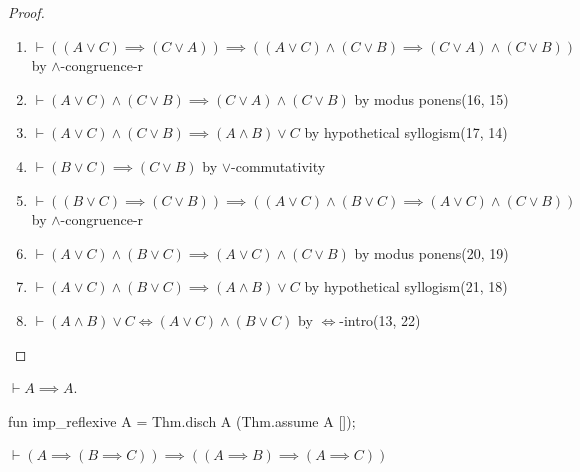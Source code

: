 \begin{proof}
\begin{enumerate}
\item $\vdash((A\lor C)\implies(C\lor A))\implies((A\lor C)\land(C\lor B)\implies(C\lor A)\land(C\lor B))$
  by $\land$-congruence-r%
\item $\vdash(A\lor C)\land(C\lor B)\implies(C\lor A)\land(C\lor B)$
  by modus ponens(16, 15)%
\item $\vdash(A\lor C)\land(C\lor B)\implies(A\land B)\lor C$ by
  hypothetical syllogism(17, 14)%
\item $\vdash(B\lor C)\implies(C\lor B)$ by $\lor$-commutativity%
\item $\vdash((B\lor C)\implies(C\lor B))\implies((A\lor C)\land(B\lor
  C)\implies(A\lor C)\land(C\lor B))$
  by $\land$-congruence-r%
\item $\vdash (A\lor C)\land(B\lor C)\implies(A\lor C)\land(C\lor B)$
  by modus ponens(20, 19)%
\item $\vdash(A\lor C)\land(B\lor C)\implies(A\land B)\lor C$ by
  hypothetical syllogism(21, 18)%
\item $\vdash(A\land B)\lor C\iff(A\lor C)\land(B\lor C)$ by
  $\Leftrightarrow$-intro(13, 22)\qedhere
\end{enumerate}
\end{proof}

\begin{node}
$\vdash A\implies A$.
\end{node}

\nwenddocs{}\endmoddef\nwstartdeflinemarkup{}\nwenddeflinemarkup
fun imp_reflexive A =
  Thm.disch A (Thm.assume A []);
\nwendcode{}\nwdocspar

\begin{theorem}[Frege]
$\vdash(A\implies(B\implies C))\implies((A\implies B)\implies(A\implies C))$
\end{theorem}

